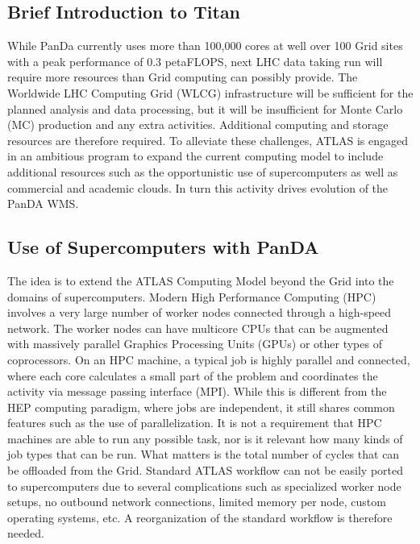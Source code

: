 \subsection{Brief Introduction to Titan}

While PanDa  currently uses  more than 100,000  cores at well over 100 Grid
sites with a  peak performance  of 0.3 petaFLOPS,  next LHC data taking run will
require more resources  than Grid computing can possibly provide. The Worldwide
LHC Computing Grid (WLCG) infrastructure will be sufficient for the planned
analysis and data processing, but it will be insufficient  for Monte Carlo (MC)
production and any extra activities. Additional computing and storage  resources
are therefore required.  To alleviate  these challenges, ATLAS is engaged  in an
ambitious  program to expand  the current computing model to include  additional
resources such as the opportunistic   use of supercomputers   as well as
commercial and academic clouds. In turn this activity drives evolution of the
PanDA WMS\@.

\subsection{Use of Supercomputers with PanDA}

The idea is to extend the ATLAS Computing Model beyond the Grid into the domains
of supercomputers. Modern High Performance Computing  (HPC) involves  a very
large number of worker nodes  connected  through a  high-speed   network. The
worker nodes can have  multicore CPUs that can be augmented with massively
parallel Graphics Processing Units (GPUs) or other types of coprocessors. On an
HPC machine, a  typical job is highly parallel and connected,  where each core
calculates  a small part of the problem and coordinates the activity via message
passing interface (MPI). While this is different from the HEP computing
paradigm, where jobs are independent, it still shares common  features  such as
the use of parallelization. It is not a requirement  that HPC machines are able
to run any possible task, nor is it relevant how many kinds of job types that
can be run. What matters is the total number of cycles that can be offloaded
from the Grid. Standard  ATLAS  workflow  can not be easily ported to
supercomputers   due  to   several   complications such  as specialized worker
node  setups, no  outbound network connections,  limited memory per node, custom
operating systems,  etc. A reorganization  of the standard  workflow is
therefore needed.

